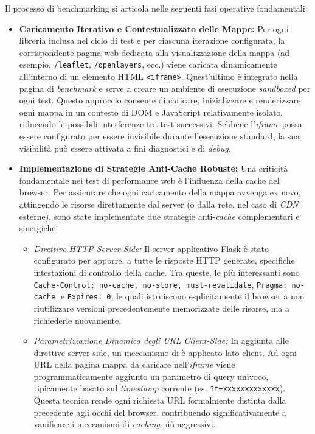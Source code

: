 Il processo di benchmarking si articola nelle seguenti fasi operative fondamentali:

\begin{itemize}[leftmargin=*]
    \item \textbf{Caricamento Iterativo e Contestualizzato delle Mappe:}
    Per ogni libreria inclusa nel ciclo di test e per ciascuna iterazione configurata, la corrispondente pagina web dedicata alla visualizzazione della mappa (ad esempio, \texttt{/leaflet}, \texttt{/openlayers}, ecc.) viene caricata dinamicamente all'interno di un elemento HTML \texttt{<iframe>}. Quest'ultimo è integrato nella pagina di \textit{benchmark} e serve a creare un ambiente di esecuzione \textit{sandboxed} per ogni test. Questo approccio consente di caricare, inizializzare e renderizzare ogni mappa in un contesto di DOM e JavaScript relativamente isolato, riducendo le possibili interferenze tra test successivi. Sebbene l'\textit{iframe} possa essere configurato per essere invisibile durante l'esecuzione standard, la sua visibilità può essere attivata a fini diagnostici e di \textit{debug}.

    \item \textbf{Implementazione di Strategie Anti-Cache Robuste:}
    Una criticità fondamentale nei test di performance web è l'influenza della cache del browser. Per assicurare che ogni caricamento della mappa avvenga ex novo, attingendo le risorse direttamente dal server (o dalla rete, nel caso di \textit{CDN} esterne), sono state implementate due strategie anti-\textit{cache} complementari e sinergiche:
    \begin{itemize}
        \item \textit{Direttive HTTP Server-Side:} Il server applicativo Flask è stato configurato per apporre, a tutte le risposte HTTP generate, specifiche intestazioni di controllo della cache. Tra queste, le più interessanti sono \texttt{Cache-Control: no-cache, no-store, must-revalidate}, \texttt{Pragma: no-cache}, e \texttt{Expires: 0}, le quali istruiscono esplicitamente il browser a non riutilizzare versioni precedentemente memorizzate delle risorse, ma a richiederle nuovamente.
        \item \textit{Parametrizzazione Dinamica degli URL Client-Side:} In aggiunta alle direttive server-side, un meccanismo di  è applicato lato client. Ad ogni URL della pagina mappa da caricare nell'\textit{iframe} viene programmaticamente aggiunto un parametro di query univoco, tipicamente basato sul \textit{timestamp} corrente (es. \texttt{?t=xxxxxxxxxxxxx}). Questa tecnica rende ogni richiesta URL formalmente distinta dalla precedente agli occhi del browser, contribuendo significativamente a vanificare i meccanismi di \textit{caching} più aggressivi.
    \end{itemize}


\end{itemize}

